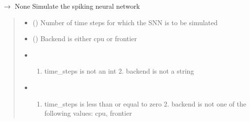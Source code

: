 \documentclass[letterpaper,10pt,english]{sphinxmanual}
\begin{document}
\begin{fulllineitems}
\begin{fulllineitems}
\begin{quote}
\begin{description}
\begin{itemize}
\begin{enumerate}
\end{enumerate}


\end{itemize}

\end{description}\end{quote}

\end{fulllineitems}


\begin{fulllineitems}
\label{\detokenize{index:id5}}
\pysigstartsignatures
\pysiglinewithargsret
{}
{}
{{ $\rightarrow$ None}}
\pysigstopsignatures
\sphinxAtStartPar
Simulate the spiking neural network
\begin{quote}\begin{description}
\begin{itemize}
\item {} 
\sphinxAtStartPar
{} () \textendash{} Number of time steps for which the SNN is to be simulated

\item {} 
\sphinxAtStartPar
{} () \textendash{} Backend is either cpu or frontier

\end{itemize}

\begin{itemize}
\item {} 
\sphinxAtStartPar
{} \textendash{} \begin{enumerate}
%
\item {} 
\sphinxAtStartPar
time\_steps is not an int
    2. backend is not a string

\end{enumerate}


\item {} 
\sphinxAtStartPar
{} \textendash{} \begin{enumerate}
%
\item {} 
\sphinxAtStartPar
time\_steps is less than or equal to zero
    2. backend is not one of the following values: cpu, frontier


\end{enumerate}
\end{itemize}
\end{description}
\end{quote}
\end{fulllineitems}
\end{fulllineitems}
\end{document}
